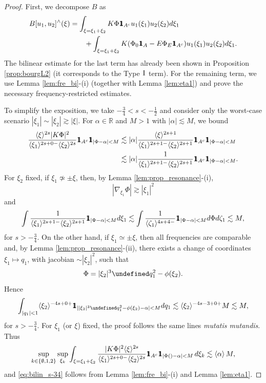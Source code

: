 \documentclass[a4paper,
11pt,  reqno]{amsart}
\makeatletter
\newcommand{\mathbbm}[1]{\mathchoice%
    {\hbox{\sffamily 1\kern-.40em 1}}%
    {\hbox{\sffamily 1\kern-.40em 1}}%
    {\hbox{\scriptsize\sffamily 1\kern-.30em 1}}%
    {\hbox{\tiny\sffamily 1\kern-.25em 1}}}%
\newcommand{\jap}[1]{\langle #1 \rangle}
\newcommand{\I}{\hspace{0.2mm}\textup{I}\hspace{0.2mm}}
\newcommand{\5}{\textup{V}}
\newcommand{\ind}{\mathbbm 1}
\theoremstyle{remark}
\newcommand{\R}{\mathbb{R}}
\let\Re=\undefined\DeclareMathOperator*{\Re}{Re}
\def\<#1>{\csname MH@symb@#1\endcsname}
\numberwithin{equation}{section}
\numberwithin{theorem}{section}
\makeatother
\begin{document}
\begin{proof}
First, we decompose $B$ as
\begin{align*}
B[u_1,u_2]^\wedge(\xi)&=\int_{\xi=\xi_1+\xi_2} K\Phi\mathbbm{1}_{A^c}u_1(\xi_1)u_2(\xi_2)d\xi_1 \\&\qquad+ \int_{\xi=\xi_1+\xi_2} K(\Phi_0\mathbbm{1}_A -E\Phi_E\mathbbm{1}_{A^c})u_1(\xi_1)u_2(\xi_2)d\xi_1.
\end{align*}
The bilinear estimate for the last term has already been shown in Proposition \ref{prop:bourgL2} (it corresponds to the Type $\I$ term). For the remaining term, we use Lemma \ref{lem:fre_bi}-(i) (together with Lemma \ref{lem:eta1}) and prove the necessary frequency-restricted estimates.

To simplify the exposition, we take $-\frac34<s<-\frac12$ and consider only the worst-case scenario $|\xi_1|\sim |\xi_2|\gtrsim |\xi|$. For $\alpha\in\R$ and $M>1$ with $|\alpha|\lesssim M$, we bound
\begin{align}
\frac{\jap{\xi}^{2s}|K\Phi|^2}{\jap{\xi_1}^{2s+0-}\jap{\xi_2}^{2s}}\mathbbm{1}_{A^c}\ind_{|\Phi-\alpha|<M}&\lesssim |\alpha|\frac{\jap{\xi}^{2s+1}}{\jap{\xi_1}^{2s+1-}\jap{\xi_2}^{2s+1}}\mathbbm{1}_{A^c}\ind_{|\Phi-\alpha|<M}\\&\lesssim |\alpha|\frac{1}{\jap{\xi_1}^{2s+1-}\jap{\xi_2}^{2s+1}}\mathbbm{1}_{A^c}\ind_{|\Phi-\alpha|<M}.
\end{align}
For $\xi_2$ fixed, if $\xi_1\not\simeq \pm\xi$, then, by Lemma \ref{lem:prop_resonance}-(i),
$$
|\nabla_{\xi_1}\Phi|\gtrsim |\xi_1|^2
$$
and
\begin{align}
\int \frac{1}{\jap{\xi_1}^{2s+1-}\jap{\xi_2}^{2s+1}}\ind_{|\Phi-\alpha|<M}d\xi_1 \lesssim \int \frac{1}{\jap{\zeta_1}^{4s+4-}}\ind_{|\Phi-\alpha|<M}d\Phi d\zeta_1 \lesssim M,
\end{align}
for $s>-\frac34$. On the other hand, if $\xi_1\simeq \pm \xi$, then all frequencies are comparable and, by Lemma \ref{lem:prop_resonance}-(ii), there exists a change of coordinates $\xi_1\mapsto q_1$, with jacobian $\sim |\xi_2|^2$, such that
$$
\Phi=|\xi_2|^3\Re q_1^2-\phi(\xi_2).
$$
Hence
\begin{align*}
\int_{|q_1|<1} \jap{\xi_2}^{-4s+0+}\ind_{||\xi_2|^3\Re q_1^2-\phi(\xi_2)-\alpha|<M}dq_1 \lesssim \jap{\xi_2}^{-4s-3+0+}M\lesssim M,
\end{align*}
for $s>-\frac34$.
\smallskip
For $\xi_1$ (or $\xi$) fixed, the proof follows the same lines \textit{mutatis mutandis}. Thus
\begin{equation}\label{eq:final_appendix}
\sup_{k\in\{\emptyset, 1, 2\}}\sup_{\xi_k}\int_{\xi=\xi_1+\xi_2}
        \frac{|K\Phi|^2\jap{\xi}^{2s}}{\jap{\xi_{1}}^{2s+0-}\jap{\xi_{2}}^{2s}}\ind_{A^c}\mathbbm{1}_{|\Phi(\<1>)-\alpha|<M}\, d\xi_{k} \lesssim \jap{\alpha}\,M,
    \end{equation}
and \eqref{eq:bilin_s-34} follows from Lemma \ref{lem:fre_bi}-(i) and Lemma \ref{lem:eta1}.
\end{proof}





\end{document}
